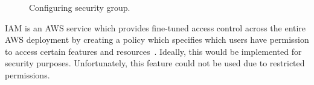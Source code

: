 \begin{figure}[!htbp]
    \centering
    \hfill
    \hfill
    \hfill
    \caption{Configuring security group.}
    \label{fig:security-groups}
\end{figure}

IAM is an AWS service which provides fine-tuned access control across the entire AWS deployment by creating a policy
which specifies which users have permission to access certain features and resources~\parencite{amazon2022aws2}.
Ideally, this would be implemented for security purposes.
Unfortunately, this feature could not be used due to restricted permissions.

